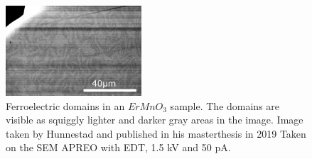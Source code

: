 

\begin{figure}
    \centering
    \includegraphics[width=0.45\textwidth]{figures/ferroelectric_domains_SEM_Hunnestad2019.jpg}
    \caption{
        Ferroelectric domains in an $ErMnO_3$ sample.
        The domains are visible as squiggly lighter and darker gray areas in the image.
        Image taken by Hunnestad and published in his masterthesis in 2019 %
        Taken on the SEM APREO with EDT, 1.5 kV and 50 pA.
    }
    \label{fig:ferroelectric_domains_SEM_Hunnestad2019}
\end{figure}
